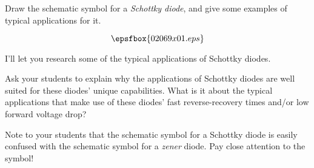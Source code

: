 

Draw the schematic symbol for a {\it Schottky diode}, and give some examples of typical applications for it.







$$\epsfbox{02069x01.eps}$$

I'll let you research some of the typical applications of Schottky diodes.







Ask your students to explain why the applications of Schottky diodes are well suited for these diodes' unique capabilities.  What is it about the typical applications that make use of these diodes' fast reverse-recovery times and/or low forward voltage drop?

Note to your students that the schematic symbol for a Schottky diode is easily confused with the schematic symbol for a {\it zener} diode.  Pay close attention to the symbol!




